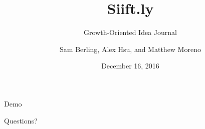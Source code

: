 \documentclass[10pt]{beamer}
\title{Siift.ly}
\subtitle{Growth-Oriented Idea Journal}
\date{December 16, 2016}
\author{Sam Berling, Alex Hsu, and Matthew Moreno}
\institute{CSCI 240 Software Engineering, Professor Tony Mullen}
\begin{document}
\maketitle





\begin{frame}[standout]
  Demo
\end{frame}



\begin{frame}[standout]
  Questions?
\end{frame}

\appendix
\end{document}
